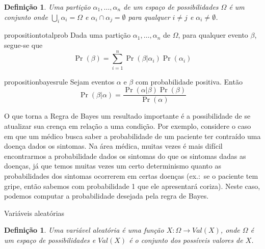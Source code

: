 \documentclass{amsart}
\makeatletter
\def\subsection{\@startsection{subsection}{3}%
  \z@{.5\linespacing\@plus.7\linespacing}{.1\linespacing}%
  {\normalfont\itshape}}
\theoremstyle{plain}
\newcounter{dummy-def}\numberwithin{dummy-def}{subsection}
\newtheorem{definition}[dummy-def]{Definição}
\newcounter{dummy-thm}\numberwithin{dummy-thm}{subsection}
\newcounter{dummy-prop}\numberwithin{dummy-prop}{subsection}
\newcounter{dummy-ex}\numberwithin{dummy-ex}{subsection}
\newcounter{dummy-eg}\numberwithin{dummy-eg}{subsection}
\numberwithin{equation}{subsection}
\makeatother
\begin{document}
\begin{definition}
  Uma partição $\alpha_1,\ldots,\alpha_n$ de um espaço de possibilidades $\Omega$ é um conjunto
  onde $\bigcup_i \alpha_i=\Omega$ e $\alpha_i\cap\alpha_j=\emptyset$ para qualquer $i\neq j$ e
  $\alpha_i\neq\emptyset$.
\end{definition}

\begin{restatable}{proposition}{totalprob}\label{prop:total-prob}
  Dada uma partição $\alpha_1,\ldots,\alpha_n$ de $\Omega$, para qualquer evento $\beta$, segue-se
  que
  \begin{equation}
    \Pr(\beta)=\sum_{i=1}^n \Pr(\beta|\alpha_i)\Pr(\alpha_i)
  \end{equation}
\end{restatable}

\begin{restatable}{proposition}{bayesrule}\label{prop:bayes-rule}
  Sejam eventos $\alpha$ e $\beta$ com probabilidade positiva. Então
  \begin{equation*}
    \Pr(\beta|\alpha)=\frac{\Pr(\alpha|\beta)\Pr(\beta)}{\Pr(\alpha)}
  \end{equation*}
\end{restatable}

O que torna a Regra de Bayes um resultado importante é a possibilidade de se atualizar sua crença
em relação a uma condição. Por exemplo, considere o caso em que um médico busca saber a
probabilidade de um paciente ter contraído uma doença dados os sintomas. Na área médica, muitas
vezes é mais difícil encontrarmos a probabilidade dados os sintomas do que os sintomas dadas as
doenças, já que temos muitas vezes um certo determinismo quanto as probabilidades dos sintomas
ocorrerem em certas doenças (ex.:\ se o paciente tem gripe, então sabemos com probabilidade 1 que
ele apresentará coriza). Neste caso, podemos computar a probabilidade desejada pela regra de Bayes.

\subsection{Variáveis aleatórias}

\begin{definition}
  Uma variável aleatória é uma função $X:\Omega\to Val(X)$, onde $\Omega$ é um espaço de
  possibilidades e $Val(X)$ é o conjunto dos possíveis valores de $X$.
\end{definition}
\end{document}
